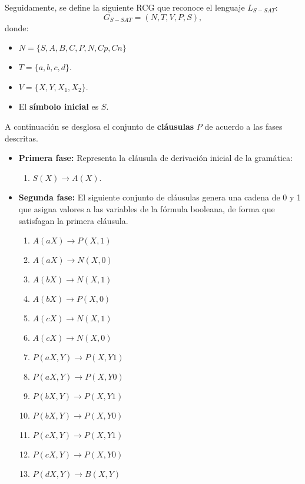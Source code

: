 \documentclass[12pt]{article}
\begin{document}
Seguidamente, se define la siguiente RCG que reconoce el lenguaje $L_{S-SAT}$:
\[
    G_{S-SAT} = (N, T, V, P, S),
\]
donde:

\begin{itemize}
    \item $N=\{S,A,B,C,P,N,Cp,Cn\}$
    \item $T=\{a,b,c,d\}$.
    \item $V=\{X,Y,X_1,X_2\}$.
    \item El \textbf{símbolo inicial} es $S$.
\end{itemize}

A continuación se desglosa el conjunto de \textbf{cláusulas} $P$ de acuerdo a las fases descritas.

\begin{itemize}
    \item \textbf{Primera fase:} Representa la cláusula de derivación inicial de la gramática:
          \begin{enumerate}
              \item $S(X)\to A(X)$.
          \end{enumerate}
          
    \item \textbf{Segunda fase:} El siguiente conjunto de cláusulas genera una cadena de 0 y 1 que asigna valores a las
          variables de la fórmula booleana, de forma que satisfagan la primera cláusula.
          \begin{multicols}{2}
              \begin{enumerate}[start=2]
                  \item $A(aX)\to P(X,1)$
                  \item $A(aX)\to N(X,0)$
                  \item $A(bX)\to N(X,1)$
                  \item $A(bX)\to P(X,0)$
                  \item $A(cX)\to N(X,1)$
                  \item $A(cX)\to N(X,0)$
                        
                  \item $P(aX,Y)\to P(X,Y1)$
                  \item $P(aX,Y)\to P(X,Y0)$
                  \item $P(bX,Y)\to P(X,Y1)$
                  \item $P(bX,Y)\to P(X,Y0)$
                  \item $P(cX,Y)\to P(X,Y1)$
                  \item $P(cX,Y)\to P(X,Y0)$
                  \item $P(dX,Y)\to B(X,Y)$
                        

\end{enumerate}
\end{multicols}
\end{itemize}
\end{document}

